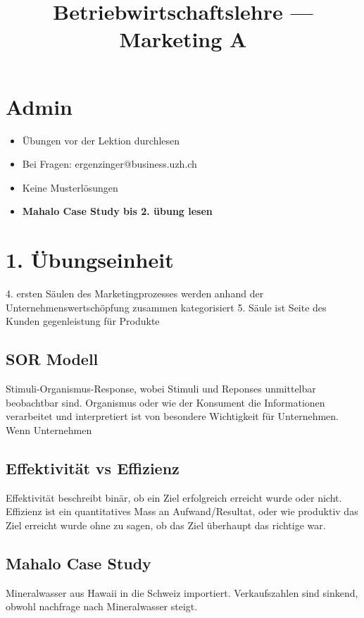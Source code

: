 \documentclass[a4paper]{article}
\title{\textbf{Betriebwirtschaftslehre — Marketing A}}
\begin{document}
    \maketitle
\section{Admin}
\begin{itemize}
    \item Übungen vor der Lektion durchlesen
    \item Bei Fragen: ergenzinger@business.uzh.ch
    \item Keine Musterlösungen
    \item \textbf{Mahalo Case Study bis 2. übung lesen}
\end{itemize}

\section{1. Übungseinheit}
4. ersten Säulen des Marketingprozesses werden anhand der Unternehmenswertschöpfung zusammen kategorisiert
5. Säule ist Seite des Kunden gegenleistung für Produkte

\subsection{SOR Modell}
Stimuli-Organismus-Response, wobei Stimuli und Reponses unmittelbar beobachtbar sind. 
Organismus oder wie der Konsument die Informationen verarbeitet und interpretiert ist von besondere Wichtigkeit für Unternehmen.
Wenn Unternehmen

\subsection{Effektivität vs Effizienz}
Effektivität beschreibt binär, ob ein Ziel erfolgreich erreicht wurde oder nicht. Effizienz ist ein quantitatives Mass an Aufwand/Resultat, oder wie produktiv das Ziel erreicht wurde ohne zu sagen, ob das Ziel überhaupt das richtige war.

\subsection{Mahalo Case Study}
Mineralwasser aus Hawaii in die Schweiz importiert. Verkaufszahlen sind sinkend, obwohl nachfrage nach Mineralwasser steigt.
\pagebreak
\end{document}
